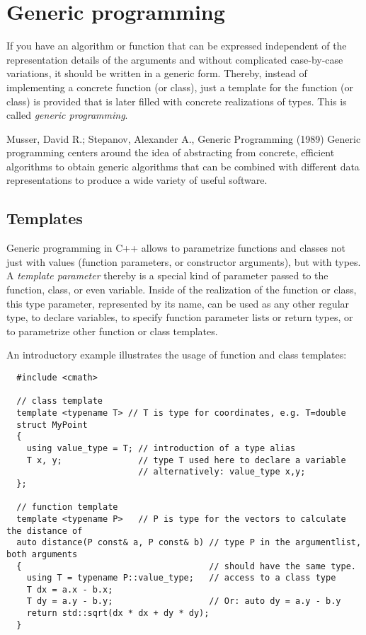 \chapter{Generic programming}
If you have an algorithm or function that can be expressed independent of the representation details of the arguments and without complicated case-by-case
variations, it should be written in a generic form. Thereby, instead of implementing a concrete function (or class), just a template for the function (or class)
is provided that is later filled with concrete realizations of types. This is called \emph{generic programming}.

\begin{zitat}{Musser, David R.; Stepanov, Alexander A., Generic Programming (1989)}
  Generic programming centers around the idea of abstracting from concrete, efficient algorithms to obtain generic algorithms that can be combined with
  different data representations to produce a wide variety of useful software.
\end{zitat}


\section{Templates}
Generic programming in C++ allows to parametrize functions and classes not just with values (function parameters, or constructor arguments), but with types.
A \emph{template parameter} thereby is a special kind of parameter passed to the function, class, or even variable. Inside of the realization of the function
or class, this type parameter, represented by its name, can be used as any other regular type, \eg to declare variables, to specify function parameter lists
or return types, or to parametrize other function or class templates.

An introductory example illustrates the usage of function and class templates:
\begin{verbatim}
  #include <cmath>

  // class template
  template <typename T> // T is type for coordinates, e.g. T=double
  struct MyPoint
  {
    using value_type = T; // introduction of a type alias
    T x, y;               // type T used here to declare a variable
                          // alternatively: value_type x,y;
  };

  // function template
  template <typename P>   // P is type for the vectors to calculate the distance of
  auto distance(P const& a, P const& b) // type P in the argumentlist, both arguments
  {                                     // should have the same type.
    using T = typename P::value_type;   // access to a class type
    T dx = a.x - b.x;
    T dy = a.y - b.y;                   // Or: auto dy = a.y - b.y
    return std::sqrt(dx * dx + dy * dy);
  }
\end{verbatim}


